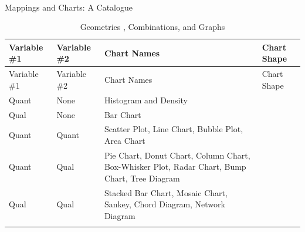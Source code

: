 \documentclass[
  letterpaper,
  DIV=11,
  numbers=noendperiod]{scrartcl}
\makeatletter
\let\oldparagraph\paragraph
\renewcommand{\paragraph}{
    \@ifstar
      \xxxParagraphStar
      \xxxParagraphNoStar
  }
\newcommand{\xxxParagraphStar}[1]{\oldparagraph*{#1}\mbox{}}
\newcommand{\xxxParagraphNoStar}[1]{\oldparagraph{#1}\mbox{}}
\makeatother
\begin{document}
\paragraph{Mappings and Charts: A
Catalogue}\label{mappings-and-charts-a-catalogue}

\begin{longtable}[]{@{}
  >{\raggedright\arraybackslash}p{}
  >{\raggedright\arraybackslash}p{}
  >{\raggedright\arraybackslash}p{}
  >{\raggedright\arraybackslash}p{}@{}}
\caption{Geometries , Combinations, and Graphs}\tabularnewline
\toprule\noalign{}
\begin{minipage}[b]{\linewidth}\raggedright
Variable \#1
\end{minipage} & \begin{minipage}[b]{\linewidth}\raggedright
Variable \#2
\end{minipage} & \begin{minipage}[b]{\linewidth}\raggedright
Chart Names
\end{minipage} & \begin{minipage}[b]{\linewidth}\raggedright
Chart Shape
\end{minipage} \\
\midrule\noalign{}
\endfirsthead
\toprule\noalign{}
\begin{minipage}[b]{\linewidth}\raggedright
Variable \#1
\end{minipage} & \begin{minipage}[b]{\linewidth}\raggedright
Variable \#2
\end{minipage} & \begin{minipage}[b]{\linewidth}\raggedright
Chart Names
\end{minipage} & \begin{minipage}[b]{\linewidth}\raggedright
Chart Shape
\end{minipage} \\
\midrule\noalign{}
\endhead
\bottomrule\noalign{}
\endlastfoot
Quant & None & Histogram and Density &  \\
Qual & None & Bar Chart & \\
Quant & Quant & Scatter Plot, Line Chart, Bubble Plot, Area Chart &  \\
Quant & Qual & Pie Chart, Donut Chart, Column Chart, Box-Whisker Plot,
Radar Chart, Bump Chart, Tree Diagram &  \\
Qual & Qual & Stacked Bar Chart, Mosaic Chart, Sankey, Chord Diagram,
Network Diagram &  \\
& & & \\
\end{longtable}
\end{document}
